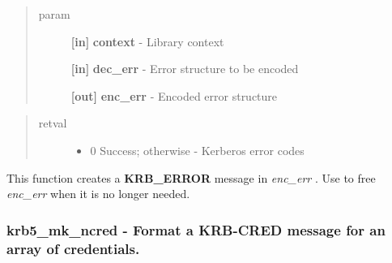 \documentclass[letterpaper,10pt,english]{sphinxmanual}
\begin{document}
\begin{fulllineitems}
\label{appdev/refs/api/krb5_mk_error:krb5_mk_error}
\end{fulllineitems}

\begin{quote}\begin{description}
\item[{param}] \leavevmode
\textbf{{[}in{]}} \textbf{context} - Library context

\textbf{{[}in{]}} \textbf{dec\_err} - Error structure to be encoded

\textbf{{[}out{]}} \textbf{enc\_err} - Encoded error structure

\end{description}\end{quote}
\begin{quote}\begin{description}
\item[{retval}] \leavevmode\begin{itemize}
\item {} 
0   Success; otherwise - Kerberos error codes

\end{itemize}

\end{description}\end{quote}

This function creates a \textbf{KRB\_ERROR} message in \emph{enc\_err} . Use {\hyperref[appdev/refs/api/krb5_free_data_contents:krb5_free_data_contents]{}} to free \emph{enc\_err} when it is no longer needed.


\subsubsection{krb5\_mk\_ncred -  Format a KRB-CRED message for an array of credentials.}
\label{appdev/refs/api/krb5_mk_ncred::doc}\label{appdev/refs/api/krb5_mk_ncred:krb5-mk-ncred-format-a-krb-cred-message-for-an-array-of-credentials}
\end{document}
